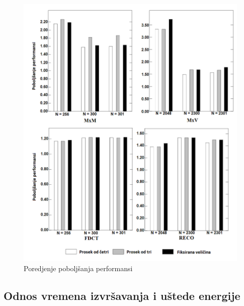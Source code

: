 \documentclass[a4paper]{article}
\begin{document}
\begin{figure}[h]
\includegraphics[scale=0.5]{performanse3}
\caption{Poredjenje poboljšanja performansi}
\label{fig:slika4}
\end{figure}

\subsection{Odnos vremena izvršavanja i uštede energije}
\label{sec:naslov}

  

\newpage
\end{document}
